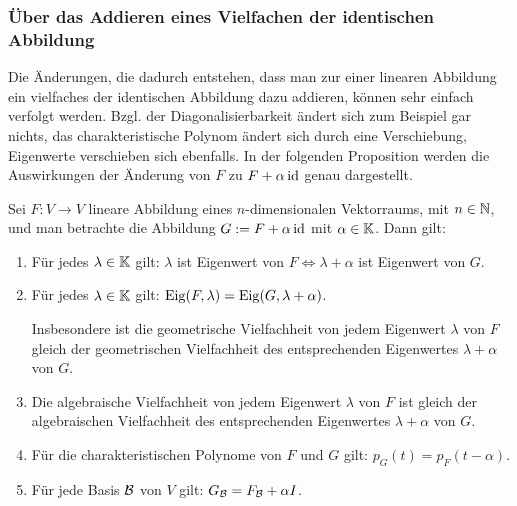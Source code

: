 \subsubsection{Über das Addieren eines Vielfachen der identischen Abbildung}
\label{sec:6_4_3}


Die Änderungen, die dadurch entstehen, dass man zur einer linearen Abbildung ein vielfaches der identischen Abbildung dazu addieren, können sehr einfach verfolgt werden. Bzgl. der Diagonalisierbarkeit ändert sich zum Beispiel gar nichts, das charakteristische Polynom ändert sich durch eine Verschiebung, Eigenwerte verschieben sich ebenfalls. In der folgenden Proposition werden die Auswirkungen der Änderung von $F$ zu $ F + \alpha \operatorname{id}$ genau dargestellt. 

\begin{propn}[Verschiebungstrick]
	Sei $F : V \to V$ lineare Abbildung eines $n$-dimensionalen Vektorraums, mit $n \in \mathbb N$, und man betrachte die Abbildung $G : = F + \alpha \operatorname{id}$ mit $\alpha \in \mathbb K$.  Dann gilt:
	\begin{enumerate}
		\item
		Für jedes $ \lambda \in \mathbb K $ gilt:
		$ \lambda $ ist Eigenwert von $ F \Leftrightarrow \lambda + \alpha $ ist Eigenwert von $ G $.
		\item
		Für jedes $ \lambda \in \mathbb K $ gilt:
		$ \operatorname{Eig}(F,\lambda) = \operatorname{Eig}(G,\lambda + \alpha) $.
		
		Insbesondere ist die geometrische Vielfachheit von jedem Eigenwert $ \lambda $ von $ F $ gleich der geometrischen Vielfachheit des entsprechenden Eigenwertes $ \lambda + \alpha $ von $ G $.
		\item
		Die algebraische Vielfachheit von jedem Eigenwert $ \lambda $ von $ F $ ist gleich der algebraischen Vielfachheit des entsprechenden Eigenwertes $ \lambda + \alpha $ von $ G $.
		\item
		Für die charakteristischen Polynome von $ F $ und $ G $ gilt: $ p_G(t) = p_F(t - \alpha) $.
		\item
		Für jede Basis $ \mathcal{B} $ von $ V $ gilt: $ G_{\mathcal{B}} = F_{\mathcal{B}} + \alpha I $.
	\end{enumerate}
\end{propn}
